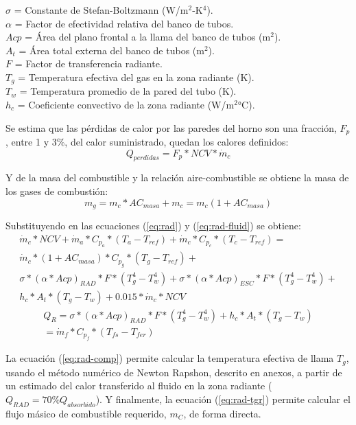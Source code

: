 $\sigma$ = Constante de Stefan-Boltzmann (W/m$^2$-K$^4$).\\
$\alpha$ = Factor de efectividad relativa del banco de tubos.\\
$Acp$ = Área del plano frontal a la llama del banco de tubos (m$^2$).\\
$A_t$ = Área total externa del banco de tubos (m$^2$).\\
$F$ = Factor de transferencia radiante.\\
$T_g$ = Temperatura efectiva del gas en la zona radiante (K).\\
$T_w$ = Temperatura promedio de la pared del tubo (K).\\
$h_c$ = Coeficiente convectivo de la zona radiante (W/m$^2$°C).
\par Se estima que las pérdidas de calor por las paredes del horno son una fracción, $F_p$, entre 1 y 3\%, del calor suministrado, quedan los calores definidos:
\begin{equation}
    Q_{perdidas} = F_p * NCV * \dot m_c
\end{equation}
\par Y de la masa del combustible y la relación aire-combustible se obtiene la masa de los gases de combustión:
\begin{equation}
    m_g = m_c * AC_{masa} + m_c = m_c (1 + AC_{masa})
\end{equation}
\par Substituyendo en las ecuaciones (\ref{eq:rad}) y (\ref{eq:rad-fluid}) se obtiene:
\begin{equation}\label{eq:rad-tgr}
\begin{gathered}
\dot m_c*NCV + \dot m_a*C_{p_a} * (T_a -T_{ref}) 
+ \dot m_c*C_{p_c} * (T_c -T_{ref}) = \\
\dot m_c*(1 +AC_{masa}) * C_{p_g} * (T_g -T_{ref}) + \\
\sigma *(\alpha *Acp)_{RAD}*F*(T_g^4-T_w^4) + 
\sigma *(\alpha *Acp)_{ESC}*F*(T_g^4-T_w^4) + \\
h_{c}*A_t*(T_g -T_w) + 0.015*\dot m_c*NCV
\end{gathered}
\end{equation}
\begin{equation}
\begin{gathered}
\label{eq:rad-comp}
Q_R = 
\sigma * (\alpha *Acp)_{RAD} *F *(T_g^4 -T_w^4) +h_{c} *A_t *(T_g -T_w)\\
= \dot m_f * C_{p_f} * (T_{fs} - T_{fer})
\end{gathered}
\end{equation}
\par La ecuación (\ref{eq:rad-comp}) permite calcular la  temperatura efectiva de llama $T_{g}$, usando el método numérico de Newton Rapshon, descrito en anexos, a partir de un estimado del calor transferido al fluido en la zona radiante ($Q_{RAD} = 70\% Q_{absorbido}$). Y finalmente, la ecuación (\ref{eq:rad-tgr}) permite calcular el flujo másico de combustible requerido, $m_C$, de forma directa.


